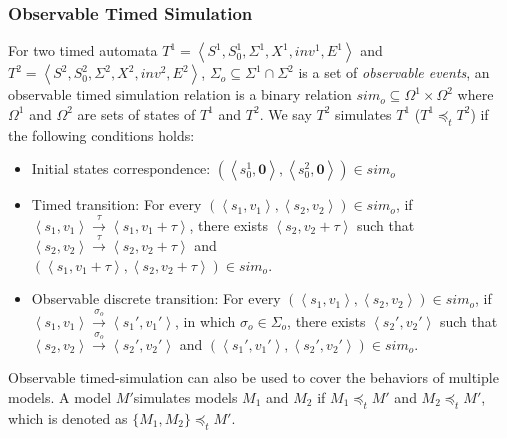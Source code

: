 \subsubsection{Observable Timed Simulation}
For two timed automata $T^1=\left\langle S^1,S_0^1,\Sigma^1,X^1,inv^1,E^1\right\rangle$ and $T^2=\left\langle S^2,S_0^2,\Sigma^2,X^2,inv^2,E^2\right\rangle$, $\Sigma_o\subseteq\Sigma^1\cap\Sigma^2$ is a set of \emph{observable events}, an observable timed simulation relation is a binary relation $sim_o\subseteq \Omega^1\times \Omega^2$ where $\Omega^1$ and $\Omega^2$ are sets of states of $T^1$ and $T^2$. We say $T^2$ simulates $T^1$ ($T^1 \preceq_t T^2$) if the following conditions holds:
\begin{itemize}
	\item Initial states correspondence: $(\left\langle s_0^1,\textbf{0}\right\rangle,\left\langle s_0^2,\textbf{0}\right\rangle)\in sim_o$
	\item Timed transition: For every $(\left\langle s_1,v_1\right\rangle,\left\langle s_2,v_2\right\rangle)\in sim_o$, if $\left\langle s_1,v_1\right\rangle\xrightarrow{\tau}\left\langle s_1,v_1+\tau\right\rangle$, there exists $\left\langle s_2,v_2+\tau\right\rangle$ such that $\left\langle s_2,v_2\right\rangle\xrightarrow{\tau}\left\langle s_2,v_2+\tau\right\rangle$ and \\$(\left\langle s_1,v_1+\tau\right\rangle,\left\langle s_2,v_2+\tau\right\rangle)\in sim_o$.
	\item Observable discrete transition: For every $(\left\langle s_1,v_1\right\rangle,\left\langle s_2,v_2\right\rangle)\in sim_o$, if $\left\langle s_1,v_1\right\rangle\xrightarrow{\sigma_o}\left\langle s_1',v_1'\right\rangle$, in which $\sigma_o\in\Sigma_o$, there exists $\left\langle s_2',v_2'\right\rangle$ such that $\left\langle s_2,v_2\right\rangle\xrightarrow{\sigma_o}\left\langle s_2',v_2'\right\rangle$ and $(\left\langle s_1',v_1'\right\rangle,\left\langle s_2',v_2'\right\rangle)\in sim_o$.
\end{itemize}


Observable timed-simulation can also be used to cover the behaviors of multiple models. 
A model $M'$simulates models $M_1$ and $M_2$ if $M_1\preceq_t M'$ and $M_2\preceq_t M'$,
which is denoted as $\{M_1,M_2\}\preceq_t M'$.

